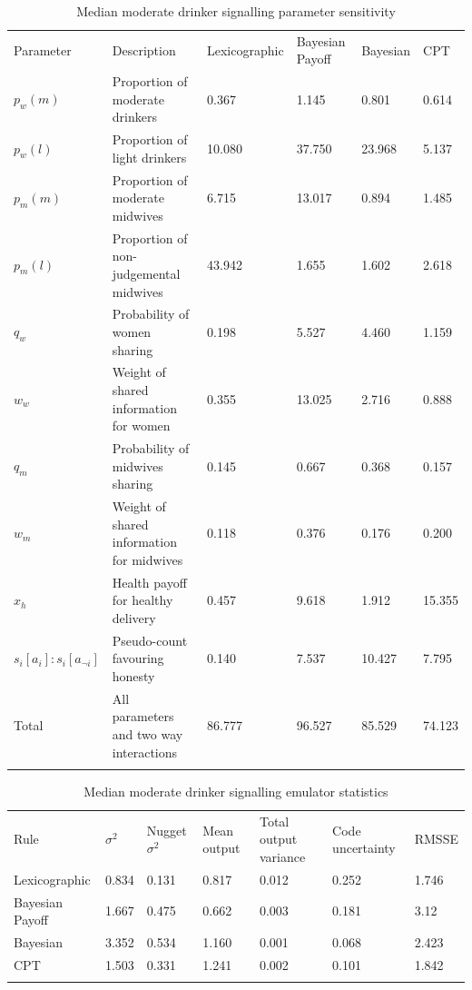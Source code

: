 \documentclass[graybox]{svmult}
\begin{document}
\begin{table}[H]
\caption{Median moderate drinker signalling parameter sensitivity \label{tab:sa_results_sig}}
\begin{tabular} {llllll}
\hline\noalign{\smallskip}
Parameter & Description & Lexicographic & Bayesian Payoff & Bayesian & \ac{CPT} \\
\noalign{\smallskip}\svhline\noalign{\smallskip}
\(p_{w}(m)\) & Proportion of moderate drinkers & 0.367 & 1.145 & 0.801 & 0.614 \\
\(p_{w}(l)\) & Proportion of light drinkers & 10.080 & 37.750 & 23.968  & 5.137\\
\(p_{m}(m)\) & Proportion of moderate midwives & 6.715 & 13.017 & 0.894 & 1.485\\
\(p_{m}(l)\) & Proportion of non-judgemental midwives & 43.942 & 1.655 & 1.602 & 2.618 \\
\(q_{w}\) & Probability of women sharing & 0.198 & 5.527 & 4.460 & 1.159 \\
\(w_{w}\) & Weight of shared information for women & 0.355 & 13.025 & 2.716 & 0.888 \\
\(q_{m}\) & Probability of midwives sharing & 0.145 & 0.667 & 0.368 & 0.157 \\
\(w_{m}\) & Weight of shared information for midwives & 0.118 & 0.376 & 0.176 & 0.200 \\
\(x_{h}\) & Health payoff for healthy delivery & 0.457 & 9.618 & 1.912 & 15.355 \\
\(s_{i}[a_{i}]:s_{i}[a_{\neg i}]\) & Pseudo-count favouring honesty & 0.140 & 7.537 & 10.427 & 7.795 \\
Total & All parameters and two way interactions & 86.777 & 96.527 & 85.529 & 74.123 \\
\noalign{\smallskip}\hline\noalign{\smallskip}
\end{tabular}
\end{table}

\begin{table}[H]
\caption{Median moderate drinker signalling emulator statistics \label{tab:sa_emulator_sig}}
\begin{tabular} {lllllll}
\hline\noalign{\smallskip}
Rule & \(\sigma^2\) & Nugget \(\sigma^2\) & Mean output & Total output variance & Code uncertainty & RMSSE \\
\noalign{\smallskip}\svhline\noalign{\smallskip}
Lexicographic & 0.834 & 0.131 &  0.817 & 0.012 & 0.252 & 1.746 \\
Bayesian Payoff & 1.667 & 0.475 &  0.662 & 0.003 & 0.181 & 3.12 \\
Bayesian & 3.352 & 0.534 & 1.160 & 0.001 & 0.068 & 2.423 \\
\ac{CPT} & 1.503 & 0.331 & 1.241 & 0.002 & 0.101 & 1.842 \\
\noalign{\smallskip}\hline\noalign{\smallskip}
\end{tabular}
\end{table}
\end{document}
